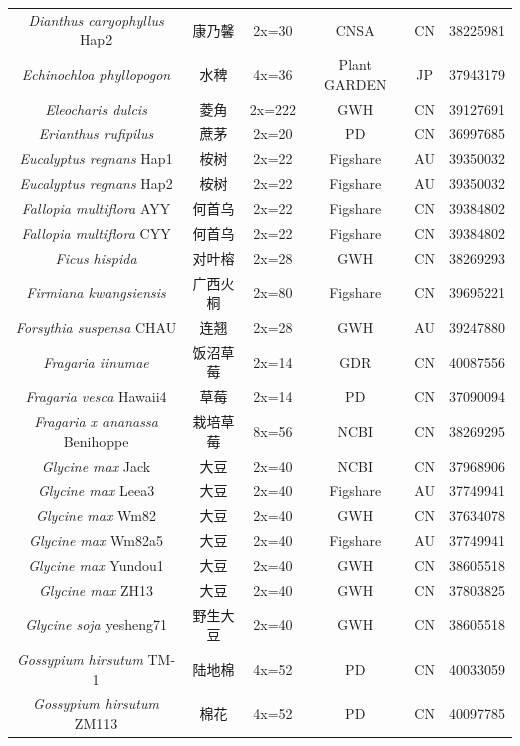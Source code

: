{{\begin{longtable}{cccccc}
    \textit{Dianthus caryophyllus} Hap2 & 康乃馨 & 2x=30 & CNSA & CN & 38225981 \\
    \textit{Echinochloa phyllopogon} & 水稗 & 4x=36 & Plant GARDEN & JP & 37943179 \\
    \textit{Eleocharis dulcis} & 菱角 & 2x=222 & GWH & CN & 39127691 \\
    \textit{Erianthus rufipilus} & 蔗茅 & 2x=20 & PD & CN & 36997685 \\
    \textit{Eucalyptus regnans} Hap1 & 桉树 & 2x=22 & Figshare & AU & 39350032 \\
    \textit{Eucalyptus regnans} Hap2 & 桉树 & 2x=22 & Figshare & AU & 39350032 \\
    \textit{Fallopia multiflora} AYY & 何首乌 & 2x=22 & Figshare & CN & 39384802 \\
    \textit{Fallopia multiflora} CYY & 何首乌 & 2x=22 & Figshare & CN & 39384802 \\
    \textit{Ficus hispida} & 对叶榕 & 2x=28 & GWH & CN & 38269293 \\
    \textit{Firmiana kwangsiensis} & 广西火桐 & 2x=80 & Figshare & CN & 39695221 \\
    \textit{Forsythia suspensa} CHAU & 连翘 & 2x=28 & GWH & AU & 39247880 \\
    \textit{Fragaria iinumae} & 饭沼草莓 & 2x=14 & GDR & CN & 40087556 \\
    \textit{Fragaria vesca} Hawaii4 & 草莓 & 2x=14 & PD & CN & 37090094 \\
    \textit{Fragaria x ananassa} Benihoppe & 栽培草莓 & 8x=56 & NCBI & CN & 38269295 \\
    \textit{Glycine max} Jack & 大豆 & 2x=40 & NCBI & CN & 37968906 \\
    \textit{Glycine max} Leea3 & 大豆 & 2x=40 & Figshare & AU & 37749941 \\
    \textit{Glycine max} Wm82 & 大豆 & 2x=40 & GWH & CN & 37634078 \\
    \textit{Glycine max} Wm82a5 & 大豆 & 2x=40 & Figshare & AU & 37749941 \\
    \textit{Glycine max} Yundou1 & 大豆 & 2x=40 & GWH & CN & 38605518 \\
    \textit{Glycine max} ZH13 & 大豆 & 2x=40 & GWH & CN & 37803825 \\
    \textit{Glycine soja} yesheng71 & 野生大豆 & 2x=40 & GWH & CN & 38605518 \\
    \textit{Gossypium hirsutum} TM-1 & 陆地棉 & 4x=52 & PD & CN & 40033059 \\
    \textit{Gossypium hirsutum} ZM113 & 棉花 & 4x=52 & PD & CN & 40097785 \\

\end{longtable}}}
